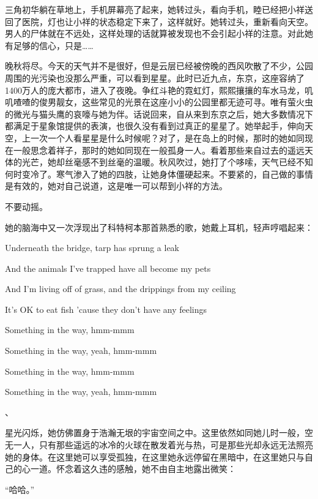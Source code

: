 \documentclass{article}
\begin{document}
\newpage



三角初华躺在草地上，手机屏幕亮了起来，她转过头，看向手机，睦已经把小祥送回了医院，灯也让小祥的状态稳定下来了，这样就好。她转过头，重新看向天空。男人的尸体就在不远处，这样处理的话就算被发现也不会引起小祥的注意。对此她有足够的信心，只是……



晚秋将尽。今天的天气并不是很好，但是云层已经被傍晚的西风吹散了不少，公园周围的光污染也没那么严重，可以看到星星。此时已近九点，东京，这座容纳了1400万人的庞大都市，进入了夜晚。争红斗艳的霓虹灯，熙熙攘攘的车水马龙，叽叽喳喳的俊男靓女，这些常见的光景在这座小小的公园里都无迹可寻。唯有萤火虫的微光与猫头鹰的哀嚎与她为伴。话说回来，自从来到东京之后，她大多数情况下都满足于星象馆提供的表演，也很久没有看到过真正的星星了。她举起手，伸向天空，上一次一个人看星星是什么时候呢？对了，是在岛上的时候，那时的她如同现在一般思念着祥子，那时的她如同现在一般孤身一人。看着那些来自过去的遥远天体的光芒，她却丝毫感不到丝毫的温暖。秋风吹过，她打了个哆嗦，天气已经不知何时变冷了。寒气渗入了她的四肢，让她身体僵硬起来。不要紧的，自己做的事情是有效的，她对自己说道，这是唯一可以帮到小祥的方法。



不要动摇。



她的脑海中又一次浮现出了科特柯本那首熟悉的歌，她戴上耳机，轻声哼唱起来：



Underneath the bridge, tarp has sprung a leak

And the animals I've trapped have all become my pets

And I'm living off of grass, and the drippings from my ceiling

It's OK to eat fish 'cause they don't have any feelings

Something in the way, hmm-mmm

Something in the way, yeah, hmm-mmm

Something in the way, hmm-mmm

Something in the way, yeah, hmm-mmm

、



星光闪烁，她仿佛置身于浩瀚无垠的宇宙空间之中。这里依然如同她儿时一般，空无一人，只有那些遥远的冰冷的火球在散发着光与热，可是那些光却永远无法照亮她的身体。在这里她可以享受孤独，在这里她永远停留在黑暗中，在这里她只与自己的心一道。怀念着这久违的感触，她不由自主地露出微笑：



“哈哈。”
\end{document}
